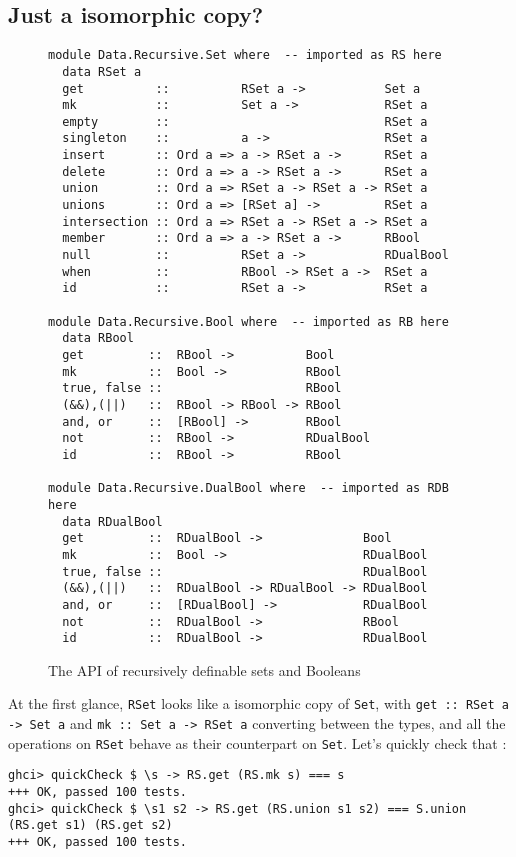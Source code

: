\documentclass[manuscript,screen,acmsmall]{acmart}
\begin{document}
\subsection{Just a isomorphic copy?}

\begin{figure}
\begin{verbatim}
module Data.Recursive.Set where  -- imported as RS here
  data RSet a
  get          ::          RSet a ->           Set a
  mk           ::          Set a ->            RSet a
  empty        ::                              RSet a
  singleton    ::          a ->                RSet a
  insert       :: Ord a => a -> RSet a ->      RSet a
  delete       :: Ord a => a -> RSet a ->      RSet a
  union        :: Ord a => RSet a -> RSet a -> RSet a
  unions       :: Ord a => [RSet a] ->         RSet a
  intersection :: Ord a => RSet a -> RSet a -> RSet a
  member       :: Ord a => a -> RSet a ->      RBool
  null         ::          RSet a ->           RDualBool
  when         ::          RBool -> RSet a ->  RSet a
  id           ::          RSet a ->           RSet a

module Data.Recursive.Bool where  -- imported as RB here
  data RBool
  get         ::  RBool ->          Bool
  mk          ::  Bool ->           RBool
  true, false ::                    RBool
  (&&),(||)   ::  RBool -> RBool -> RBool
  and, or     ::  [RBool] ->        RBool
  not         ::  RBool ->          RDualBool
  id          ::  RBool ->          RBool

module Data.Recursive.DualBool where  -- imported as RDB here
  data RDualBool
  get         ::  RDualBool ->              Bool
  mk          ::  Bool ->                   RDualBool
  true, false ::                            RDualBool
  (&&),(||)   ::  RDualBool -> RDualBool -> RDualBool
  and, or     ::  [RDualBool] ->            RDualBool
  not         ::  RDualBool ->              RBool
  id          ::  RDualBool ->              RDualBool
\end{verbatim}
\caption{The API of recursively definable sets and Booleans}\label{fig:api}
\end{figure}

At the first glance, \verb|RSet| looks like a isomorphic copy of \verb|Set|, with \verb|get :: RSet a -> Set a| and \verb|mk :: Set a -> RSet a| converting between the types, and all the operations on \verb|RSet| behave as their counterpart on \verb|Set|. Let's quickly check that \citep{quickcheck}:
\begin{verbatim}
ghci> quickCheck $ \s -> RS.get (RS.mk s) === s
+++ OK, passed 100 tests.
ghci> quickCheck $ \s1 s2 -> RS.get (RS.union s1 s2) === S.union (RS.get s1) (RS.get s2)
+++ OK, passed 100 tests.
\end{verbatim}
\end{document}
